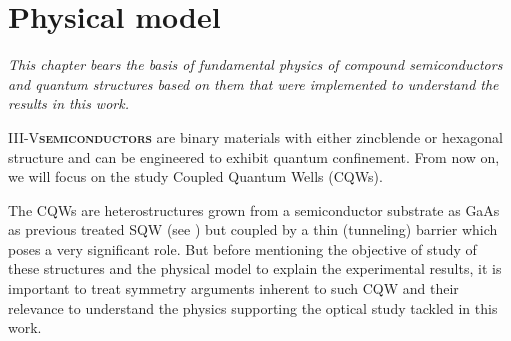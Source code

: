 \chapter{Physical model}
\label{chap:Chapter-2}
\textit{
% 
This chapter bears the basis of fundamental physics of compound semiconductors and quantum structures based on them that were implemented to understand the results in this work.
}
\vfill
\minitoc
\newpage

\lettrine[lines=2, lraise=.1, nindent=0mm, slope=0mm]{III-V}{\textbf{semiconductors}} are binary materials with either zincblende or hexagonal structure and can be engineered to exhibit  quantum confinement.  
From now on, we will focus on the study Coupled Quantum Wells  (\gls{CQWs}). 

The \gls{CQWs} are heterostructures grown from a semiconductor substrate as GaAs as previous treated \gls{SQW}
(see ) but coupled by a thin (tunneling) barrier which poses a very significant role. But before mentioning the objective of study of these structures and the physical model to explain the
experimental results, it is important to treat symmetry  arguments inherent to such CQW \cite{van1989laws} and their relevance  to understand the physics supporting  the optical study tackled in this work. 

